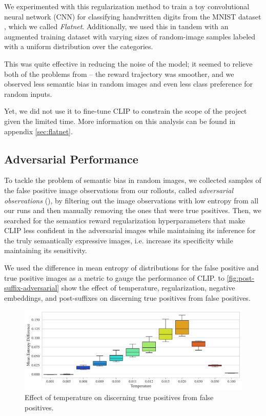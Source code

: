 We experimented with this regularization method to train a toy convolutional neural network (CNN) for classifying handwritten digits from the MNIST dataset \citep{mnist}, which we called \emph{Flatnet}.
Additionally, we used this in tandem with an augmented training dataset with varying sizes of random-image samples labeled with a uniform distribution over the categories.

This was quite effective in reducing the noise of the model; it seemed to relieve both of the problems from  -- the reward trajectory was smoother, and we observed less semantic bias in random images and even less class preference for random inputs.

Yet, we did not use it to fine-tune CLIP to constrain the scope of the project given the limited time.
More information on this analysis can be found in appendix \ref{sec:flatnet}.

\subsection{Adversarial Performance}
\label{sec:adversarial-performance}
To tackle the problem of semantic bias in random images, we collected samples of the false positive image observations from our rollouts, called \emph{adversarial observations} (), by filtering out the image observations with low entropy from all our runs and then manually removing the ones that were true positives.
Then, we searched for the semantics reward regularization hyperparameters that make CLIP less confident in the adversarial images while maintaining its inference for the truly semantically expressive images, i.e. increase its specificity while maintaining its sensitivity.

We used the difference in mean entropy of distributions for the false positive and true positive images as a metric to gauge the performance of CLIP.
 to \ref{fig:post-suffix-adversarial} show the effect of temperature, regularization, negative embeddings, and post-suffixes on discerning true positives from false positives.

\begin{figure}[H]
    \centering
    \includegraphics[width=\textwidth]{images/temperature_adversarial.pdf}
    \caption{Effect of temperature on discerning true positives from false positives.}
    \label{fig:clip-temperature-adversarial}
\end{figure}

